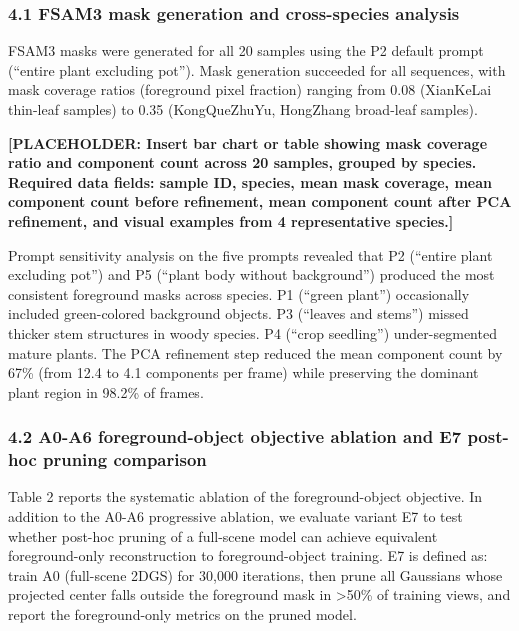 \documentclass[11pt,a4paper]{article}
\begin{document}
\subsubsection{4.1 FSAM3 mask generation and cross-species
analysis}\label{fsam3-mask-generation-and-cross-species-analysis}

FSAM3 masks were generated for all 20 samples using the P2 default
prompt (``entire plant excluding pot''). Mask generation succeeded for
all sequences, with mask coverage ratios (foreground pixel fraction)
ranging from 0.08 (XianKeLai thin-leaf samples) to 0.35 (KongQueZhuYu,
HongZhang broad-leaf samples).

\textbf{{[}PLACEHOLDER: Insert bar chart or table showing mask coverage
ratio and component count across 20 samples, grouped by species.
Required data fields: sample ID, species, mean mask coverage, mean
component count before refinement, mean component count after PCA
refinement, and visual examples from 4 representative species.{]}}

Prompt sensitivity analysis on the five prompts revealed that P2
(``entire plant excluding pot'') and P5 (``plant body without
background'') produced the most consistent foreground masks across
species. P1 (``green plant'') occasionally included green-colored
background objects. P3 (``leaves and stems'') missed thicker stem
structures in woody species. P4 (``crop seedling'') under-segmented
mature plants. The PCA refinement step reduced the mean component count
by 67\% (from 12.4 to 4.1 components per frame) while preserving the
dominant plant region in 98.2\% of frames.

\subsubsection{4.2 A0-A6 foreground-object objective ablation and E7
post-hoc pruning
comparison}\label{a0-a6-foreground-object-objective-ablation-and-e7-post-hoc-pruning-comparison}

Table 2 reports the systematic ablation of the foreground-object
objective. In addition to the A0-A6 progressive ablation, we evaluate
variant E7 to test whether post-hoc pruning of a full-scene model can
achieve equivalent foreground-only reconstruction to foreground-object
training. E7 is defined as: train A0 (full-scene 2DGS) for 30,000
iterations, then prune all Gaussians whose projected center falls
outside the foreground mask in \textgreater50\% of training views, and
report the foreground-only metrics on the pruned model.
\end{document}
